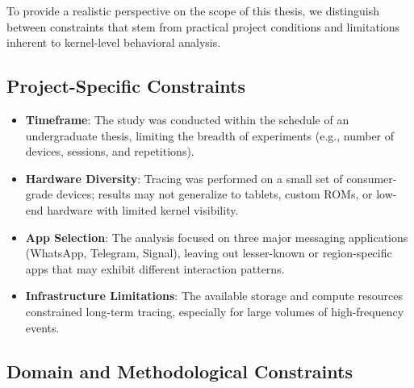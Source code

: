 \documentclass[a4paper,12pt]{report}
\begin{document}
To provide a realistic perspective on the scope of this thesis, we distinguish between constraints that stem from practical project conditions and limitations inherent to kernel-level behavioral analysis.

\subsection*{Project-Specific Constraints}

\begin{itemize}
\item \textbf{Timeframe}: The study was conducted within the schedule of an undergraduate thesis, limiting the breadth of experiments (e.g., number of devices, sessions, and repetitions).
\item \textbf{Hardware Diversity}: Tracing was performed on a small set of consumer-grade devices; results may not generalize to tablets, custom ROMs, or low-end hardware with limited kernel visibility.
\item \textbf{App Selection}: The analysis focused on three major messaging applications (WhatsApp, Telegram, Signal), leaving out lesser-known or region-specific apps that may exhibit different interaction patterns.
\item \textbf{Infrastructure Limitations}: The available storage and compute resources constrained long-term tracing, especially for large volumes of high-frequency events.
\end{itemize}

\subsection*{Domain and Methodological Constraints}
\end{document}
